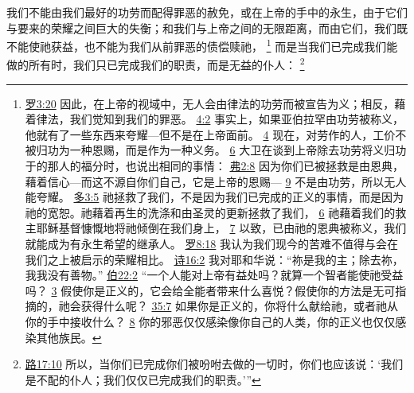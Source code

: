 \documentclass[12pt, a4paper, oneside]{ctexart}
\newcounter{parnum}[section]
\newcommand{\N}{%
   \noindent\refstepcounter{parnum}%
    \makebox[\parindent][l]{\textbf{\arabic{parnum}.}}}
\begin{document}
\N 我们不能由我们最好的功劳而配得罪恶的赦免，或在上帝的手中的永生，由于它们与要来的荣耀之间巨大的失衡；和我们与上帝之间的无限距离，而由它们，我们既不能使祂获益，也不能为我们从前罪恶的债偿赎祂，
	\footnote {
		\href{https://biblehub.com/romans/3-20.htm}{罗3:20} 因此，在上帝的视域中，无人会由律法的功劳而被宣告为义；相反，藉着律法，我们觉知到我们的罪恶。
		\href{https://biblehub.com/romans/4-2.htm}{4:2} 事实上，如果亚伯拉罕由功劳被称义，他就有了一些东西来夸耀---但不是在上帝面前。
		\href{https://biblehub.com/romans/4-4.htm}{4} 现在，对劳作的人，工价不被归功为一种恩赐，而是作为一种义务。
		\href{https://biblehub.com/romans/4-6.htm}{6} 大卫在谈到上帝除去功劳将义归功于的那人的福分时，也说出相同的事情：
		\href{https://biblehub.com/ephesians/2-8.htm}{弗2:8} 因为你们已被拯救是由恩典，藉着信心---而这不源自你们自己，它是上帝的恩赐---
		\href{https://biblehub.com/ephesians/2-9.htm}{9} 不是由功劳，所以无人能夸耀。
		\href{https://biblehub.com/titus/3-5.htm}{多3:5} 祂拯救了我们，不是因为我们已完成的正义的事情，而是因为祂的宽恕。祂藉着再生的洗涤和由圣灵的更新拯救了我们，
		\href{https://biblehub.com/titus/3-6.htm}{6} 祂藉着我们的救主耶稣基督慷慨地将祂倾倒在我们身上，
		\href{https://biblehub.com/titus/3-7.htm}{7} 以致，已由祂的恩典被称义，我们就能成为有永生希望的继承人。
		\href{https://biblehub.com/romans/8-18.htm}{罗8:18} 我认为我们现今的苦难不值得与会在我们之上被启示的荣耀相比。
		\href{https://biblehub.com/psalms/16-2.htm}{诗16:2} 我对耶和华说：“祢是我的主；除去祢，我我没有善物。”
		\href{https://biblehub.com/job/22-2.htm}{伯22:2} “一个人能对上帝有益处吗？就算一个智者能使祂受益吗？
		\href{https://biblehub.com/job/22-3.htm}{3} 假使你是正义的，它会给全能者带来什么喜悦？假使你的方法是无可指摘的，祂会获得什么呢？
		\href{https://biblehub.com/job/35-7.htm}{35:7} 如果你是正义的，你将什么献给祂，或者祂从你的手中接收什么？
        \href{https://biblehub.com/job/35-8.htm}{8} 你的邪恶仅仅感染像你自己的人类，你的正义也仅仅感染其他族民。
	}
	而是当我们已完成我们能做的所有时，我们只已完成我们的职责，而是无益的仆人：
	\footnote {
		\href{https://biblehub.com/luke/17-10.htm}{路17:10} 所以，当你们已完成你们被吩咐去做的一切时，你们也应该说：‘我们是不配的仆人；我们仅仅已完成我们的职责。’”
	}
\end{document}
